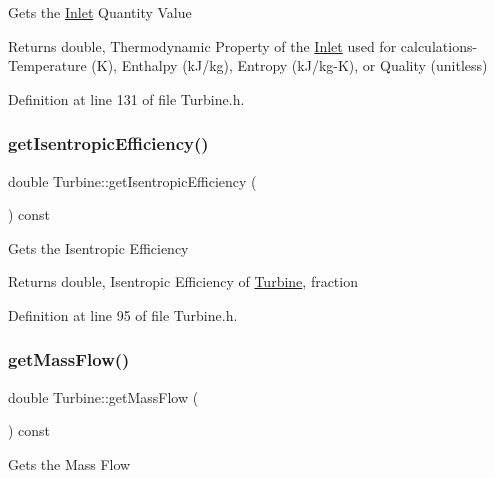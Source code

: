 Gets the \hyperlink{class_inlet}{Inlet} Quantity Value

\begin{DoxyReturn}{Returns}
double, Thermodynamic Property of the \hyperlink{class_inlet}{Inlet} used for calculations-\/ Temperature (K), Enthalpy (k\+J/kg), Entropy (k\+J/kg-\/K), or Quality (unitless) 
\end{DoxyReturn}


Definition at line 131 of file Turbine.\+h.

\mbox{\label{class_turbine_a5d907859de4acc153a32bd443238b445}} 
\subsubsection{\texorpdfstring{get\+Isentropic\+Efficiency()}{getIsentropicEfficiency()}}
{\footnotesize\ttfamily double Turbine\+::get\+Isentropic\+Efficiency (\begin{DoxyParamCaption}{ }\end{DoxyParamCaption}) const\hspace{0.3cm}{\ttfamily [inline]}}

Gets the Isentropic Efficiency

\begin{DoxyReturn}{Returns}
double, Isentropic Efficiency of \hyperlink{class_turbine}{Turbine}, fraction 
\end{DoxyReturn}


Definition at line 95 of file Turbine.\+h.

\mbox{\label{class_turbine_a4893a203dbbf9db9ca77a0b278c4c118}} 
\subsubsection{\texorpdfstring{get\+Mass\+Flow()}{getMassFlow()}}
{\footnotesize\ttfamily double Turbine\+::get\+Mass\+Flow (\begin{DoxyParamCaption}{ }\end{DoxyParamCaption}) const\hspace{0.3cm}{\ttfamily [inline]}}

Gets the Mass Flow


